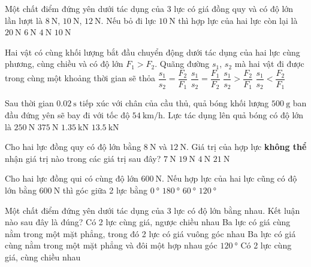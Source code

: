 \begin{ex}
	Một chất điểm đứng yên dưới tác dụng của 3 lực có giá đồng quy và có độ lớn lần lượt là $\SI{8}{\newton}$, $\SI{10}{\newton}$, $\SI{12}{\newton}$. Nếu bỏ đi lực $\SI{10}{\newton}$ thì hợp lực của hai lực còn lại là
	\choice
	{$\SI{20}{\newton}$}
	{$\SI{6}{\newton}$}
	{$\SI{4}{\newton}$}
	{\True $\SI{10}{\newton}$}
	\loigiai{}
\end{ex}
\begin{ex}
	Hai vật có cùng khối lượng bắt đầu chuyển động dưới tác dụng của hai lực cùng phương, cùng chiều và có độ lớn $F_1>F_2$. Quãng đường $s_1$, $s_2$ mà hai vật đi được trong cùng một khoảng thời gian sẽ thỏa
	\choice
	{$\dfrac{s_1}{s_2}=\dfrac{F_2}{F_1}$}
	{\True $\dfrac{s_1}{s_2}=\dfrac{F_1}{F_2}$}
	{$\dfrac{s_1}{s_2}>\dfrac{F_2}{F_1}$}
	{$\dfrac{s_1}{s_2}<\dfrac{F_2}{F_1}$}
	\loigiai{}
\end{ex}
\begin{ex}
	Sau thời gian $\SI{0.02}{\second}$ tiếp xúc với chân của cầu thủ, quả bóng khối lượng $\SI{500}{\gram}$ ban đầu đứng yên sẽ bay đi với tốc độ $\SI{54}{\kilo\meter/\hour}$. Lực tác dụng lên quả bóng có độ lớn là	
	\choice
	{$\SI{250}{\newton}$}
	{\True $\SI{375}{\newton}$}
	{$\SI{1.35}{\kilo\newton}$}
	{$\SI{13.5}{\kilo\newton}$}
	\loigiai{}
\end{ex}
\begin{ex}
	Cho hai lực đồng quy có độ lớn bằng $\SI{8}{\newton}$ và $\SI{12}{\newton}$. Giá trị của hợp lực \textbf{không thể} nhận giá trị nào trong các giá trị sau đây?
	\choice
	{$\SI{7}{\newton}$}
	{$\SI{19}{\newton}$}
	{$\SI{4}{\newton}$}
	{\True $\SI{21}{\newton}$}
	\loigiai{}
\end{ex}
\begin{ex}
	Cho hai lực đồng qui có cùng độ lớn $\SI{600}{\newton}$. Nếu hợp lực của hai lực cũng có độ lớn bằng $\SI{600}{\newton}$ thì góc giữa 2 lực bằng
	\choice
	{$\SI{0}{\degree}$}
	{$\SI{180}{\degree}$}
	{$\SI{60}{\degree}$}
	{\True $\SI{120}{\degree}$}
	\loigiai{}
\end{ex}
\begin{ex}
	Một chất điểm đứng yên dưới tác dụng của 3 lực có độ lớn bằng nhau. Kết luận nào sau đây là đúng?
	\choice
	{Có 2 lực cùng giá, ngược chiều nhau}
	{Ba lực có giá cùng nằm trong một mặt phẳng, trong đó 2 lực có giá vuông góc nhau}
	{\True Ba lực có giá cùng nằm trong một mặt phẳng và đôi một hợp nhau góc $\SI{120}{\degree}$}
	{Có 2 lực cùng giá, cùng chiều nhau}
	\loigiai{}
\end{ex}
